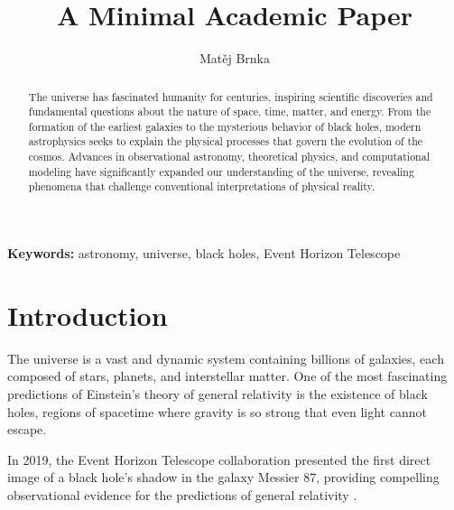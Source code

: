 \documentclass[11pt]{article}
\title{A Minimal Academic Paper} %
\author{Matěj Brnka} %
\begin{document}

\maketitle %

\begin{abstract} %
The universe has fascinated humanity for centuries, inspiring
scientific discoveries and fundamental questions about the nature
of space, time, matter, and energy. From the formation of the
earliest galaxies to the mysterious behavior of black holes,
modern astrophysics seeks to explain the physical processes
that govern the evolution of the cosmos. Advances in observational
astronomy, theoretical physics, and computational modeling have
significantly expanded our understanding of the universe,
revealing phenomena that challenge conventional interpretations
of physical reality. %
\end{abstract} %


\noindent\textbf{Keywords:} astronomy, universe, black holes, Event Horizon Telescope


\section{Introduction}

The universe is a vast and dynamic system containing billions
of galaxies, each composed of stars, planets, and interstellar
matter. One of the most fascinating predictions of Einstein's
theory of general relativity is the existence of black holes,
regions of spacetime where gravity is so strong that even
light cannot escape.

In 2019, the Event Horizon Telescope collaboration presented
the first direct image of a black hole's shadow in the galaxy
Messier 87, providing compelling observational evidence for
the predictions of general relativity
\parencite{eventhorizon2019}.

\printbibliography %
\end{document}

